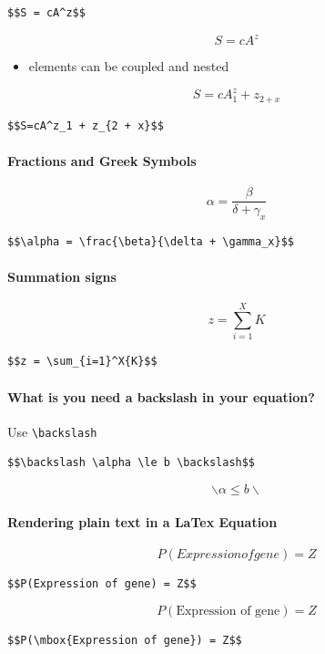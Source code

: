 \documentclass[
]{article}
\providecommand{\tightlist}{%
  \setlength{\itemsep}{0pt}\setlength{\parskip}{0pt}}
\begin{document}
\begin{verbatim}
$$S = cA^z$$
\end{verbatim}

\[S = cA^z\]

\begin{itemize}
\tightlist
\item
  elements can be coupled and nested
\end{itemize}

\[S=cA^z_1 + z_{2 + x}\]

\begin{verbatim}
$$S=cA^z_1 + z_{2 + x}$$
\end{verbatim}

\hypertarget{fractions-and-greek-symbols}{%
\paragraph{Fractions and Greek
Symbols}\label{fractions-and-greek-symbols}}

\[\alpha = \frac{\beta}{\delta + \gamma_x}\]

\begin{verbatim}
$$\alpha = \frac{\beta}{\delta + \gamma_x}$$
\end{verbatim}

\hypertarget{summation-signs}{%
\paragraph{Summation signs}\label{summation-signs}}

\[z = \sum_{i=1}^X{K}\]

\begin{verbatim}
$$z = \sum_{i=1}^X{K}$$
\end{verbatim}

\hypertarget{what-is-you-need-a-backslash-in-your-equation}{%
\paragraph{What is you need a backslash in your
equation?}\label{what-is-you-need-a-backslash-in-your-equation}}

Use \texttt{\textbackslash{}backslash}

\begin{verbatim}
$$\backslash \alpha \le b \backslash$$
\end{verbatim}

\[\backslash \alpha \le b \backslash\]

\hypertarget{rendering-plain-text-in-a-latex-equation}{%
\paragraph{Rendering plain text in a LaTex
Equation}\label{rendering-plain-text-in-a-latex-equation}}

\[P(Expression of gene) = Z\]

\begin{verbatim}
$$P(Expression of gene) = Z$$
\end{verbatim}

\[P(\mbox{Expression of gene}) = Z\]

\begin{verbatim}
$$P(\mbox{Expression of gene}) = Z$$
\end{verbatim}
\end{document}
